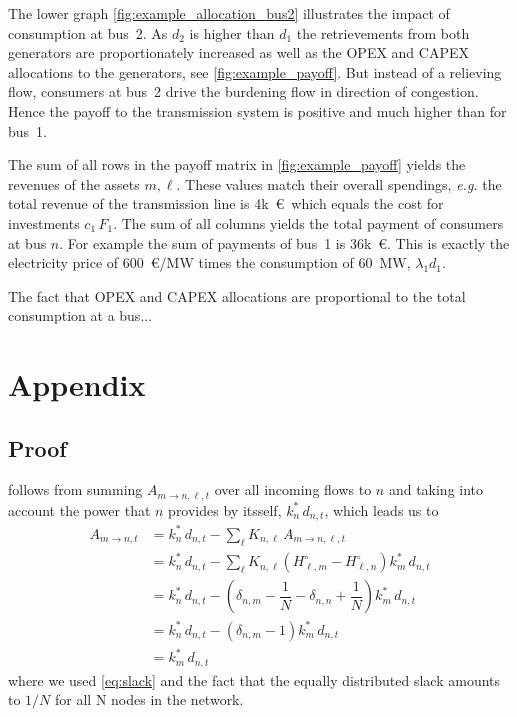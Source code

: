 \documentclass[11pt,twocolumn]{article}
\newcommand{\nodaldemand}[1][n]{d_{#1,t}}
\newcommand{\incidence}[1][n]{K_{#1,\ell}}
\newcommand{\ptdf}[1][n]{H_{\ell,#1}}
\newcommand{\ptdfEqual}[1][n]{\ptdf[#1]^\circ}
\newcommand{\slackk}[1][n]{k^*_{#1}}
\newcommand{\allocatePeer}[1][m \rightarrow n]{A_{#1,t}}
\newcommand{\allocateTransaction}[1][m \rightarrow n]{A_{#1,\ell,t}}
\begin{document}
The lower graph \cref{fig:example_allocation_bus2} illustrates the impact of consumption at bus~2. As $d_2$ is higher than $d_1$ the retrievements from both generators are proportionately increased as well as the OPEX and CAPEX allocations to the generators, see \cref{fig:example_payoff}. But instead of a relieving flow, consumers at bus~2 drive the burdening flow in direction of congestion. Hence the payoff to the transmission system is positive and much higher than for bus~1.

The sum of all rows in the payoff matrix in \cref{fig:example_payoff} yields the revenues of the assets $m, \ell$. These values match their overall spendings, \textit{e.g.} the total revenue of the transmission line is 4k~\euro\, which equals the cost for investments $c_{1}\,F_{1}$. The sum of all columns yields the total payment of consumers at bus $n$. For example the sum of payments of bus~1 is 36k~\euro. This is exactly the electricity price of 600~\euro/MW times the consumption of 60~MW, $\lambda_1 d_1$. 

The fact that OPEX and CAPEX allocations are proportional to the total consumption at a bus... 


% 
\printbibliography

\clearpage
\appendix

\section{Appendix}

\subsection{\texorpdfstring{Proof }{First Proof}}
\label{sec:proof_allocate_peer}

 follows from summing $\allocateTransaction$ over all incoming flows to $n$ and taking into account the power that $n$ provides by itsself, $\slackk \, \nodaldemand$, which leads us to
\begin{align}
 \allocatePeer &= \slackk \, \nodaldemand - \sum_{\ell} \incidence \, \allocateTransaction \\
 &= \slackk \, \nodaldemand - \sum_\ell \incidence \left(  \ptdfEqual[m] - \ptdfEqual \right) \slackk[m] \, \nodaldemand  \\
 &= \slackk \, \nodaldemand - \left(  \delta_{n,m} - \dfrac{1}{N} - \delta_{n,n} + \dfrac{1}{N} \right) \slackk[m] \, \nodaldemand  \\
 &= \slackk \, \nodaldemand - \left(  \delta_{n,m} - 1 \right) \slackk[m] \, \nodaldemand  \\
 &= \slackk[m] \, \nodaldemand 
\label{eq:proof_allocate_peer}
\end{align}
where we used \cref{eq:slack} and the fact that the equally distributed slack amounts to $1/N$ for all N nodes in the network. 
\end{document}
